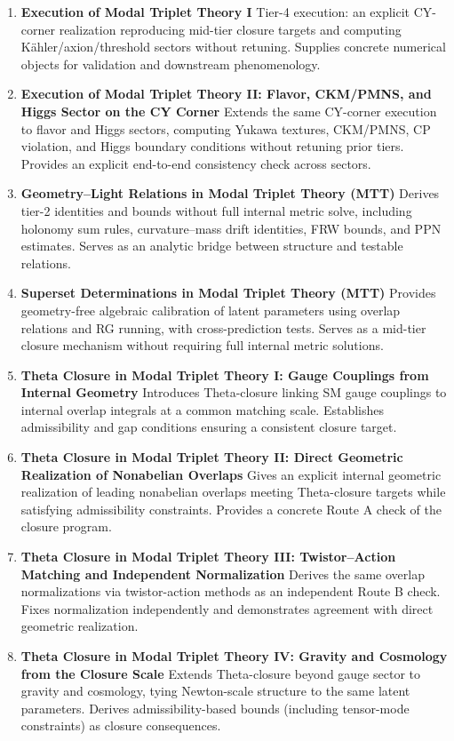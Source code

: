 \documentclass[11pt]{article}
\begin{document}
\begin{enumerate}[leftmargin=*]
\item \textbf{Execution of Modal Triplet Theory I} Tier-4 execution: an explicit CY-corner realization reproducing mid-tier closure targets and computing Kähler/axion/threshold sectors without retuning. Supplies concrete numerical objects for validation and downstream phenomenology.
\item \textbf{Execution of Modal Triplet Theory II: Flavor, CKM/PMNS, and Higgs Sector on the CY Corner} Extends the same CY-corner execution to flavor and Higgs sectors, computing Yukawa textures, CKM/PMNS, CP violation, and Higgs boundary conditions without retuning prior tiers. Provides an explicit end-to-end consistency check across sectors.
\item \textbf{Geometry–Light Relations in Modal Triplet Theory (MTT)} Derives tier-2 identities and bounds without full internal metric solve, including holonomy sum rules, curvature–mass drift identities, FRW bounds, and PPN estimates. Serves as an analytic bridge between structure and testable relations.
\item \textbf{Superset Determinations in Modal Triplet Theory (MTT)} Provides geometry-free algebraic calibration of latent parameters using overlap relations and RG running, with cross-prediction tests. Serves as a mid-tier closure mechanism without requiring full internal metric solutions.
\item \textbf{Theta Closure in Modal Triplet Theory I: Gauge Couplings from Internal Geometry} Introduces Theta-closure linking SM gauge couplings to internal overlap integrals at a common matching scale. Establishes admissibility and gap conditions ensuring a consistent closure target.
\item \textbf{Theta Closure in Modal Triplet Theory II: Direct Geometric Realization of Nonabelian Overlaps} Gives an explicit internal geometric realization of leading nonabelian overlaps meeting Theta-closure targets while satisfying admissibility constraints. Provides a concrete Route A check of the closure program.
\item \textbf{Theta Closure in Modal Triplet Theory III: Twistor–Action Matching and Independent Normalization} Derives the same overlap normalizations via twistor-action methods as an independent Route B check. Fixes normalization independently and demonstrates agreement with direct geometric realization.
\item \textbf{Theta Closure in Modal Triplet Theory IV: Gravity and Cosmology from the Closure Scale} Extends Theta-closure beyond gauge sector to gravity and cosmology, tying Newton-scale structure to the same latent parameters. Derives admissibility-based bounds (including tensor-mode constraints) as closure consequences.

\end{enumerate}
\end{document}
